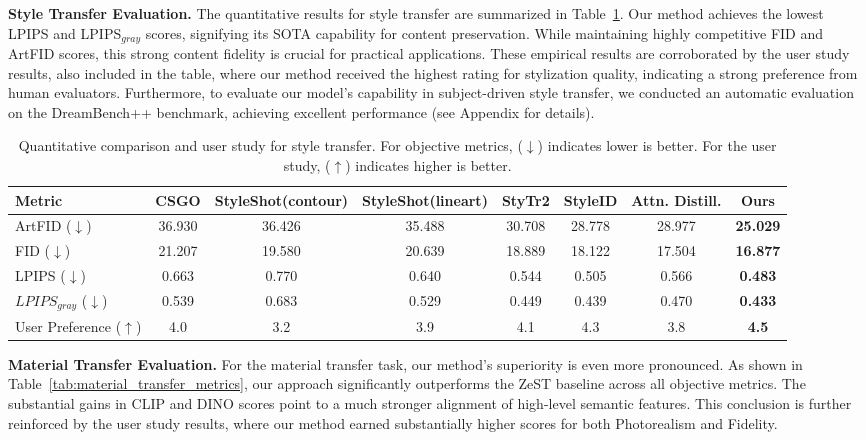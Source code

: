 \noindent\textbf{Style Transfer Evaluation.}
The quantitative results for style transfer are summarized in Table~\ref{tab:style_transfer_metrics}. Our method achieves the lowest LPIPS and LPIPS$_{gray}$ scores, signifying its SOTA capability for content preservation. While maintaining highly competitive FID and ArtFID scores, this strong content fidelity is crucial for practical applications. These empirical results are corroborated by the user study results, also included in the table, where our method received the highest rating for stylization quality, indicating a strong preference from human evaluators. Furthermore, to evaluate our model's capability in subject-driven style transfer, we conducted an automatic evaluation on the DreamBench++ benchmark, achieving excellent performance (see Appendix for details).

\begin{table}[htbp]
\centering
\small
\begin{tabular}{lccccccc}
\toprule
Metric & CSGO & StyleShot(contour) & StyleShot(lineart)& StyTr2 & StyleID  & Attn. Distill. & \textbf{Ours} \\
\midrule
ArtFID ($\downarrow$) & 36.930 & 36.426 & 35.488 & 30.708 & 28.778 & 28.977 & \textbf{25.029} \\
FID ($\downarrow$) & 21.207 & 19.580 & 20.639 & 18.889 & 18.122 & 17.504 & \textbf{16.877} \\
LPIPS ($\downarrow$) & 0.663 & 0.770 & 0.640 & 0.544 & 0.505 & 0.566 & \textbf{0.483} \\
$LPIPS_{gray}$ ($\downarrow$) & 0.539 & 0.683 & 0.529 & 0.449 & 0.439 & 0.470 & \textbf{0.433} \\
\midrule
User Preference ($\uparrow$) & 4.0 & 3.2 & 3.9 & 4.1 & 4.3 & 3.8 & \textbf{4.5} \\
\bottomrule
\end{tabular}

\caption{Quantitative comparison and user study for style transfer. For objective metrics, ($\downarrow$) indicates lower is better. For the user study, ($\uparrow$) indicates higher is better.}
\label{tab:style_transfer_metrics}
\end{table}

\noindent\textbf{Material Transfer Evaluation.}
For the material transfer task, our method's superiority is even more pronounced. As shown in Table~\ref{tab:material_transfer_metrics}, our approach significantly outperforms the ZeST baseline across all objective metrics. The substantial gains in CLIP and DINO scores point to a much stronger alignment of high-level semantic features. This conclusion is further reinforced by the user study results, where our method earned substantially higher scores for both Photorealism and Fidelity.

